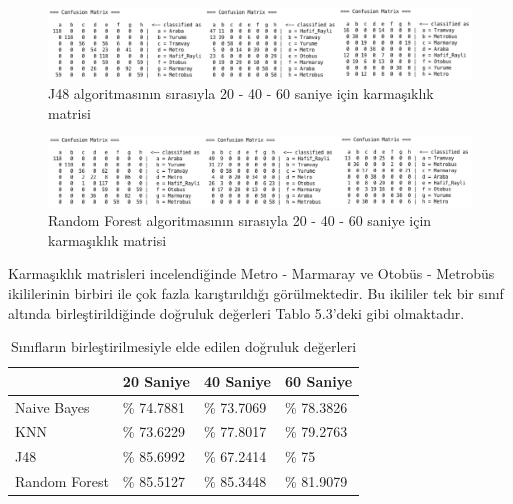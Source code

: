 \begin{figure}[!h]
\centering
\includegraphics[width=\textwidth]{projectChapters/images/J48.png}
\caption{J48 algoritmasının sırasıyla 20 - 40 - 60 saniye için karmaşıklık matrisi}
\end{figure}

\begin{figure}[!h]
\centering
\includegraphics[width=\textwidth]{projectChapters/images/RF.png}
\caption{Random Forest algoritmasının sırasıyla 20 - 40 - 60 saniye için karmaşıklık matrisi}
\end{figure}


Karmaşıklık matrisleri incelendiğinde Metro - Marmaray ve Otobüs - Metrobüs ikililerinin birbiri ile çok fazla karıştırıldığı görülmektedir. Bu ikililer tek bir sınıf altında birleştirildiğinde doğruluk değerleri Tablo 5.3'deki gibi olmaktadır.



\begin{table}[]
\centering
\caption{Sınıfların birleştirilmesiyle elde edilen doğruluk değerleri}
\label{my-label}
\begin{tabular}{|l|l|l|l|}
\hline
              & 20 Saniye  & 40 Saniye  & 60 Saniye  \\ \hline
Naive Bayes   & \% 74.7881 & \% 73.7069 & \% 78.3826 \\ \hline
KNN           & \% 73.6229 & \% 77.8017 & \% 79.2763 \\ \hline
J48           & \% 85.6992 & \% 67.2414 & \% 75      \\ \hline
Random Forest & \% 85.5127 & \% 85.3448 & \% 81.9079 \\ \hline
\end{tabular}
\end{table}

